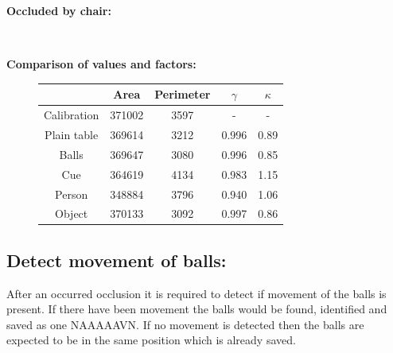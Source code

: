\textbf{Occluded by chair:}\\
\begin{figure}[H]
\centering
{}
\\
\end{figure}

\textbf{Comparison of values and factors:}

\begin{figure}[H]
\centering
\begin{tabular}{|c|c|c|c|c|}
\hline  & Area & Perimeter & $\gamma$ & $\kappa$ \\ 
\hline Calibration & 371002 & 3597 & - & - \\ 
\hline Plain table & 369614 & 3212 & 0.996 & 0.89 \\
\hline Balls & 369647 & 3080 & 0.996 & 0.85  \\ 
\hline Cue & 364619 & 4134 & 0.983 & 1.15 \\ 
\hline Person & 348884 & 3796 & 0.940 & 1.06 \\ 
\hline Object & 370133 & 3092 & 0.997 & 0.86 \\ 
\hline 
\end{tabular} 
\end{figure}

\subsection{Detect movement of balls:}
After an occurred occlusion it is required to detect if movement of the balls is present. If there have been movement the balls would be found, identified and saved as one NAAAAAVN. If no movement is detected then the balls are expected to be in the same position which is already saved.\\

